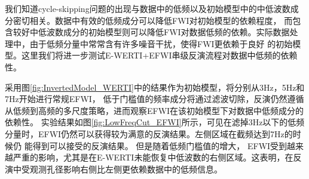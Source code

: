 我们知道cycle-skipping问题的出现与数据中的低频以及初始模型中的中低波数成分密切相关。数据中有效的低频成分可以降低FWI对初始模型的依赖程度，
而包含较好中低波数成分的初始模型则可以降低FWI对数据低频的依赖。实际数据处理中，由于低频分量中常常含有许多噪音干扰，使得FWI更依赖于良好
的初始模型。这里我们将进一步测试E-WERTI+EFWI串级反演流程对数据中低频的依赖性。

采用图\ref{fig:InvertedModel_WERTI}中的结果作为初始模型，将分别从3Hz，5Hz和7Hz开始进行常规EFWI，
低于门槛值的频率成分将通过滤波切除，反演仍然遵循从低频到高频的多尺度策略，进而观察EFWI在该初始模型下对数据中低频成分的依赖性。
实验结果如图\ref{fig:LowFreqCut_EFWI}所示，可见在滤掉3Hz以下的低频分量时，EFWI仍然可以获得较为满意的反演结果。左侧区域在截频达到7Hz的时候仍
能得到可以接受的反演结果。
但是随着低频门槛值的增大，
EFWI受到越来越严重的影响，尤其是在E-WERTI未能恢复中低波数的右侧区域。这表明，在反演中受观测孔径影响右侧比左侧更依赖数据中的低频信息。
